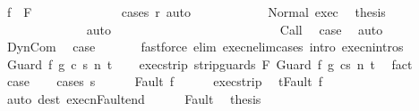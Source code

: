 \begin{isabellebody}
\ {\isachardoublequoteopen}f{\isacharprime}\ {\isasymin}\ F{\isachardoublequoteclose}\isanewline
\ \ \ \ \ \ \ \ \ \ \ \ \isamarkupfalse%
\ {\isacharparenleft}cases\ r{\isacharparenright}\ auto\isanewline
\ \ \ \ \ \ \ \ \ \ \isamarkupfalse%
\ Normal\ exec\ \isamarkupfalse%
\ {\isacharquery}thesis\isanewline
\ \ \ \ \ \ \ \ \ \ \ \ \isamarkupfalse%
\ auto\isanewline
\ \ \ \ \ \ \ \ \isamarkupfalse%
\isanewline
\ \ \ \ \ \ \isamarkupfalse%
\isanewline
\ \ \ \ \isamarkupfalse%
\isanewline
\ \ \isamarkupfalse%
\isanewline
{}\isamarkupfalse%
\isanewline
\ \ \isamarkupfalse%
\ Call\ \isamarkupfalse%
\ {\isacharquery}case\ \isamarkupfalse%
\ auto\isanewline
{}\isamarkupfalse%
\isanewline
\ \ \isamarkupfalse%
\ DynCom\ \isamarkupfalse%
\ {\isacharquery}case\ \isanewline
\ \ \ \ \isamarkupfalse%
\ {\isacharparenleft}fastforce\ elim{\isacharbang}{\isacharcolon}\ execn{\isacharunderscore}elim{\isacharunderscore}cases\ intro{\isacharcolon}\ execn{\isachardot}intros{\isacharparenright}\isanewline
{}\isamarkupfalse%
\isanewline
\ \ \isamarkupfalse%
\ {\isacharparenleft}Guard\ f\ g\ c\ s\ n\ t{\isacharparenright}\isanewline
\ \ \isamarkupfalse%
\ exec{\isacharunderscore}strip{\isacharcolon}\ {\isachardoublequoteopen}{\isasymGamma}{\isasymturnstile}{\isasymlangle}strip{\isacharunderscore}guards\ F\ {\isacharparenleft}Guard\ f\ g\ c{\isacharparenright}{\isacharcomma}s{\isasymrangle}\ {\isacharequal}n{\isasymRightarrow}\ t{\isachardoublequoteclose}\ \isamarkupfalse%
\ fact\isanewline
\ \ \isamarkupfalse%
\ {\isacharquery}case\isanewline
\ \ \isamarkupfalse%
\ {\isacharparenleft}cases\ s{\isacharparenright}\isanewline
\ \ \ \ \isamarkupfalse%
\ {\isacharparenleft}Fault\ f{\isacharparenright}\isanewline
\ \ \ \ \isamarkupfalse%
\ exec{\isacharunderscore}strip\ \isamarkupfalse%
\ {\isachardoublequoteopen}t{\isacharequal}Fault\ f{\isachardoublequoteclose}\isanewline
\ \ \ \ \ \ \isamarkupfalse%
\ {\isacharparenleft}auto\ dest{\isacharcolon}\ execn{\isacharunderscore}Fault{\isacharunderscore}end{\isacharparenright}\isanewline
\ \ \ \ \isamarkupfalse%
\ Fault\ \isamarkupfalse%
\ {\isacharquery}thesis\isanewline
\ \ \ \ \ \ \isamarkupfalse%

\end{isabellebody}
